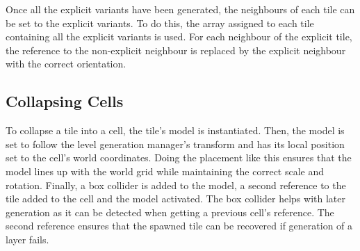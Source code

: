 
Once all the explicit variants have been generated, the neighbours of each tile can be set to the explicit variants. To do this, the array assigned to each tile containing all the explicit variants is used. For each neighbour of the explicit tile, the reference to the non-explicit neighbour is replaced by the explicit neighbour with the correct orientation.




\subsection{Collapsing Cells}
To collapse a tile into a cell, the tile's model is instantiated. Then, the model is set to follow the level generation manager's transform and has its local position set to the cell's world coordinates. Doing the placement like this ensures that the model lines up with the world grid while maintaining the correct scale and rotation. Finally, a box collider is added to the model, a second reference to the tile added to the cell and the model activated. The box collider helps with later generation as it can be detected when getting a previous cell's reference. The second reference ensures that the spawned tile can be recovered if generation of a layer fails.


